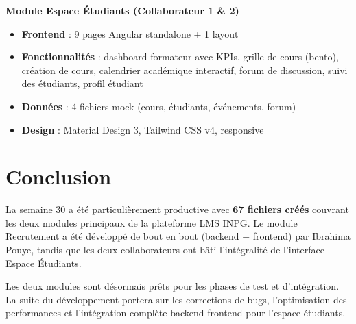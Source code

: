 \documentclass[a4paper,12pt,french]{article}
\begin{document}
\begin{modulebox}
\textbf{Module Espace Étudiants (Collaborateur 1 \& 2)}

\begin{itemize}
    \item \textbf{Frontend} : 9 pages Angular standalone + 1 layout
    \item \textbf{Fonctionnalités} : dashboard formateur avec KPIs, grille de cours (bento), création de cours, calendrier académique interactif, forum de discussion, suivi des étudiants, profil étudiant
    \item \textbf{Données} : 4 fichiers mock (cours, étudiants, événements, forum)
    \item \textbf{Design} : Material Design 3, Tailwind CSS v4, responsive
\end{itemize}
\end{modulebox}

\newpage

\section{Conclusion}

La semaine 30 a été particulièrement productive avec \textbf{67 fichiers créés} couvrant les deux modules principaux de la plateforme LMS INPG. Le module Recrutement a été développé de bout en bout (backend + frontend) par Ibrahima Pouye, tandis que les deux collaborateurs ont bâti l'intégralité de l'interface Espace Étudiants.

Les deux modules sont désormais prêts pour les phases de test et d'intégration. La suite du développement portera sur les corrections de bugs, l'optimisation des performances et l'intégration complète backend-frontend pour l'espace étudiants.
\end{document}
